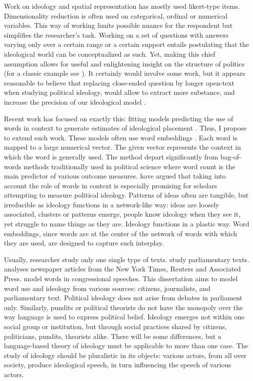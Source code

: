 \documentclass[
  openany]{book}
\begin{document}
Work on ideology and spatial representation has mostly used likert-type items. Dimensionality reduction is often used on categorical, ordinal or numerical variables. This way of working limits possible nuance for the respondent but simplifies the researcher's task. Working on a set of questions with answers varying only over a certain range or a certain support entails postulating that the ideological world can be conceptualized as such. Yet, making this chief assumption allows for useful and enlightening insight on the structure of politics (for a classic example see \citet{aldrich1977method}). It certainly would involve some work, but it appears reasonable to believe that replacing close-ended question by longer open-text when studying political ideology, would allow to extract more substance, and increase the precision of our ideological model \citep{bauer2017left}.

Recent work has focused on exactly this: fitting models predicting the use of words in context to generate estimates of ideological placement \citep{rheault2020word, rodman2020timely}. Thus, I propose to extend such work. These models often use word embeddings \citep{rumelhart1986learning, mikolov2013efficient, mikolov2013distributed}. Each word is mapped to a large numerical vector. The given vector represents the context in which the word is generally used. The method depart significantly from bag-of-words methods traditionally used in political science where word count is the main predictor of various outcome measures. \citet{rheault2020word} have argued that taking into account the role of words in context is especially promising for scholars attempting to measure political ideology. Patterns of ideas often are tangible, but irreducible as ideology functions in a network-like way: ideas are loosely associated, clusters or patterns emerge, people know ideology when they see it, yet struggle to name things as they are. Ideology functions in a plastic way. \citep{cochrane2015left} Word embeddings, since words are at the center of the network of words with which they are used, are designed to capture such interplay.

Usually, researcher study only one single type of texts. \citet{rheault2020word} study parliamentary texts. \citet{rodman2020timely} analyses newspaper articles from the New York Times, Reuters and Associated Press. \citet{rodriguez2021word} model words in congressional speeches. This dissertation aims to model word use and ideology from various sources: citizens, journalists, and parliamentary text. Political ideology does not arise from debates in parliament only. Similarly, pundits or political theorists do not have the monopoly over the way language is used to express political belief. Ideology emerges not within one social group or institution, but through social practices shared by citizens, politicians, pundits, theorists alike. There will be some differences, but a language-based theory of ideology must be applicable to more than one case. The study of ideology should be pluralistic in its objects: various actors, from all over society, produce ideological speech, in turn influencing the speech of various actors.
\end{document}
